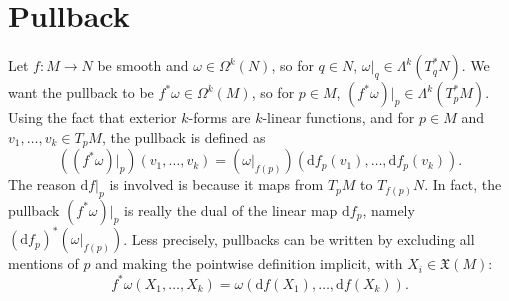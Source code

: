\documentclass[10pt]{article}
\newcommand{\de}{\mathrm{d}}
\newcommand{\frakx}{\mathfrak{X}}
\begin{document}
	\section*{Pullback}
	Let $f : M \to N$ be smooth and $\omega \in \Omega^k(N)$, so for $q \in N$, $\omega|_q \in \Lambda^k(T_q^* N)$. We want the pullback to be $f^* \omega \in \Omega^k(M)$, so for $p \in M$, $(f^* \omega)|_p \in \Lambda^k(T_p^* M)$. Using the fact that exterior $k$-forms are $k$-linear functions, and for $p \in M$ and $v_1, \ldots, v_k \in T_p M$, the pullback is defined as
	\[ ((f^* \omega)|_p)(v_1, \ldots, v_k) = (\omega|_{f(p)})(\de f_p(v_1), \ldots, \de f_p(v_k)). \]
	The reason $\de f|_p$ is involved is because it maps from $T_p M$ to $T_{f(p)} N$. In fact, the pullback $(f^* \omega)|_p$ is really the dual of the linear map $\de f_p$, namely $(\de f_p)^* (\omega|_{f(p)})$. Less precisely, pullbacks can be written by excluding all mentions of $p$ and making the pointwise definition implicit, with $X_i \in \frakx(M)$:
	\[ f^* \omega(X_1, \ldots, X_k) = \omega(\de f(X_1), \ldots, \de f(X_k)). \]
\end{document}
